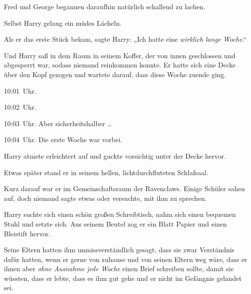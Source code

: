 Fred und George begannen daraufhin natürlich schallend zu lachen.

Selbst Harry gelang ein müdes Lächeln.

Als er das erste Stück bekam, sagte Harry: „Ich hatte eine \emph{wirklich lange Woche}.“

\later

Und Harry saß in dem Raum in seinem Koffer, der von innen geschlossen und abgesperrt war, sodass niemand reinkommen konnte. Er hatte sich eine Decke über den Kopf gezogen und wartete darauf, dass diese Woche zuende ging.

10:01~Uhr.

10:02~Uhr.

10:03~Uhr. Aber sicherheitshalber …

10:04~Uhr. Die erste Woche war vorbei.

Harry atmete erleichtert auf und guckte vorsichtig unter der Decke hervor.

Etwas später stand er in seinem hellen, lichtdurchfluteten Schlafsaal.

Kurz darauf war er im Gemeinschaftsraum der Ravenclaws. Einige Schüler sahen auf, doch niemand sagte etwas oder versuchte, mit ihm zu sprechen.

Harry suchte sich einen schön großen Schreibtisch, nahm sich einen bequemen Stuhl und setzte sich. Aus seinem Beutel zog er ein Blatt Papier und einen Bleistift hervor.

Seine Eltern hatten ihm unmissverständlich gesagt, dass sie zwar Verständnis dafür hatten, wenn er gerne von zuhause und von seinen Eltern weg wäre, dass er ihnen aber \emph{ohne Ausnahme jede Woche} einen Brief schreiben sollte, damit sie wüssten, dass er lebte, dass es ihm gut gehe und er nicht im Gefängnis gelandet sei.


